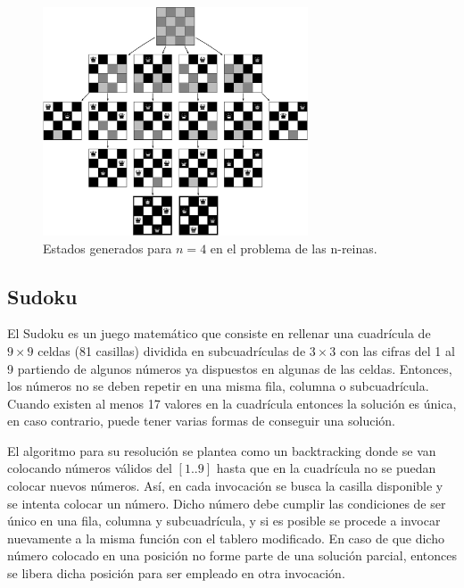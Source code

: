 \begin{figure}[htpb!]
  \begin{center}
    \includegraphics[width=0.7\textwidth]{images/reinas4.jpg}
  \end{center}
  \caption{Estados generados para $n=4$ en el problema de las n-reinas.}
  \label{fig:Ch2queen}
\end{figure}

\subsection{Sudoku}

El Sudoku es un juego matemático que consiste en rellenar una cuadrícula de $9 \times 9$ celdas (81 casillas) dividida en subcuadrículas de $3 \times 3$ con las cifras del 1 al 9 partiendo de algunos números ya dispuestos en algunas de las celdas. Entonces, los números no se deben repetir en una misma fila, columna o subcuadrícula. Cuando existen al menos 17 valores en la cuadrícula entonces la solución es única, en caso contrario, puede tener varias formas de conseguir una solución.

El algoritmo para su resolución se plantea como un backtracking donde se van colocando números válidos del $[1..9]$ hasta que en la cuadrícula no se puedan colocar nuevos números. Así, en cada invocación se busca la casilla disponible y se intenta colocar un número. Dicho número debe cumplir las condiciones de ser único en una fila, columna y subcuadrícula, y si es posible se procede a invocar nuevamente a la misma función con el tablero modificado. En caso de que dicho número colocado en una posición no forme parte de una solución parcial, entonces se libera dicha posición para ser empleado en otra invocación.

